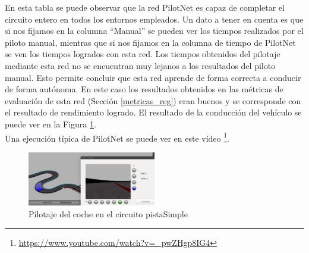 En esta tabla se puede observar que la red PilotNet es capaz de completar el circuito entero en todos los entornos empleados. Un dato a tener en cuenta es que si nos fijamos en la columna ``Manual'' se pueden ver los tiempos realizados por el piloto manual, mientras que si nos fijamos en la columna de tiempo de PilotNet se ven los tiempos logrados con esta red. Los tiempos obtenidos del pilotaje mediante esta red no se encuentran muy lejanos a los resultados del piloto manual. Esto permite concluir que esta red aprende de forma correcta a conducir de forma autónoma. En este caso los resultados obtenidos en las métricas de evaluación de esta red (Sección \ref{metricas_reg}) eran buenos y se corresponde con el resultado de rendimiento logrado. El resultado de la conducción del vehículo se puede ver en la Figura \ref{fig.simple_reg}.\\ Una ejecución típica de PilotNet se puede ver en este vídeo  \footnote{\url{https://www.youtube.com/watch?v=_pwZHgp8IG4}}.

\begin{figure}
\begin{center}
	\includegraphics[width=0.5\textwidth]{figures/Regresion/pilotnet_cropped.png}
   \caption{Pilotaje del coche en el circuito pistaSimple}
	\label{fig.simple_reg}
\end{center}
\end{figure}

